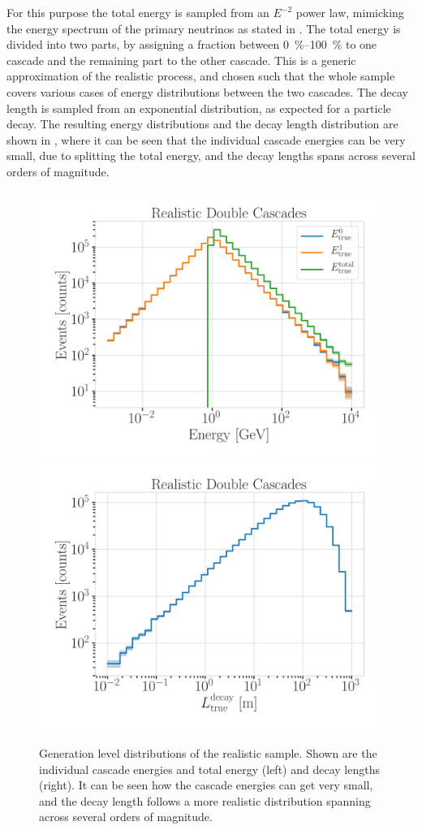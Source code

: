 For this purpose the total energy is sampled from an $E^{-2}$ power law, mimicking the energy spectrum of the primary neutrinos as stated in . The total energy is divided into two parts, by assigning a fraction between \SIrange[range-phrase={~and~}]{0}{100}{\percent} to one cascade and the remaining part to the other cascade. This is a generic approximation of the realistic process, and chosen such that the whole sample covers various cases of energy distributions between the two cascades. The decay length is sampled from an exponential distribution, as expected for a particle decay. The resulting energy distributions and the decay length distribution are shown in , where it can be seen that the individual cascade energies can be very small, due to splitting the total energy, and the decay lengths spans across several orders of magnitude.

\begin{figure}[h]
    \includegraphics[width=.49\linewidth]{figures/model_independent_simulation/gen_level/194603_gen_level_1_d_distr_all_energies.png}
    \includegraphics[width=.49\linewidth]{figures/model_independent_simulation/gen_level/194603_gen_level_1_d_distr_true_decay_length.png}
    \caption[Realistic model-independent simulation generation level distributions]{Generation level distributions of the realistic sample. Shown are the individual cascade energies and total energy (left) and decay lengths (right). It can be seen how the cascade energies can get very small, and the decay length follows a more realistic distribution spanning across several orders of magnitude.}
\end{figure}


